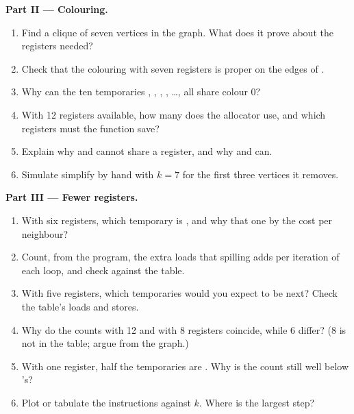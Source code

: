 \begin{problem}
\medskip\noindent\textbf{Part II --- Colouring.}
\begin{enumerate}[resume]
\item Find a clique of seven vertices in the graph. What does it prove about the registers needed?
\item Check that the colouring with seven registers is proper on the edges of .
\item Why can the ten temporaries , , , , \dots,  all share colour 0?
\item With 12 registers available, how many does the allocator use, and which  registers must the function save?
\item Explain why  and  cannot share a register, and why  and  can.
\item Simulate simplify by hand with $k = 7$ for the first three vertices it removes.
\end{enumerate}

\medskip\noindent\textbf{Part III --- Fewer registers.}
\begin{enumerate}[resume]
\item With six registers, which temporary is , and why that one by the cost per neighbour?
\item Count, from the program, the extra loads that spilling  adds per iteration of each loop, and check against the table.
\item With five registers, which temporaries would you expect to be  next? Check the table's loads and stores.
\item Why do the counts with 12 and with 8 registers coincide, while 6 differ? (8 is not in the table; argue from the graph.)
\item With one register, half the temporaries are . Why is the count still well below 's?
\item Plot or tabulate the instructions against $k$. Where is the largest step?
\end{enumerate}


\end{problem}
